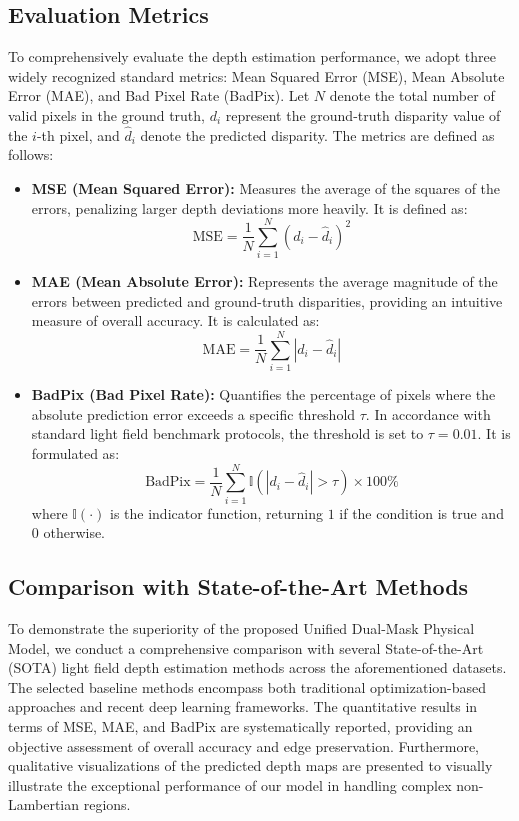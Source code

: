 \documentclass[lettersize,journal]{IEEEtran}
\begin{document}
\subsection{Evaluation Metrics}
To comprehensively evaluate the depth estimation performance, we adopt three widely recognized standard metrics: Mean Squared Error (MSE), Mean Absolute Error (MAE), and Bad Pixel Rate (BadPix). Let $N$ denote the total number of valid pixels in the ground truth, $d_i$ represent the ground-truth disparity value of the $i$-th pixel, and $\hat{d}_i$ denote the predicted disparity. The metrics are defined as follows:

\begin{itemize}
    \item \textbf{MSE (Mean Squared Error):} Measures the average of the squares of the errors, penalizing larger depth deviations more heavily. It is defined as:
    \begin{equation}
        \text{MSE} = \frac{1}{N} \sum_{i=1}^{N} (d_i - \hat{d}_i)^2
    \end{equation}
    
    \item \textbf{MAE (Mean Absolute Error):} Represents the average magnitude of the errors between predicted and ground-truth disparities, providing an intuitive measure of overall accuracy. It is calculated as:
    \begin{equation}
        \text{MAE} = \frac{1}{N} \sum_{i=1}^{N} |d_i - \hat{d}_i|
    \end{equation}
    
    \item \textbf{BadPix (Bad Pixel Rate):} Quantifies the percentage of pixels where the absolute prediction error exceeds a specific threshold $\tau$. In accordance with standard light field benchmark protocols, the threshold is set to $\tau = 0.01$. It is formulated as:
    \begin{equation}
        \text{BadPix} = \frac{1}{N} \sum_{i=1}^{N} \mathbb{I}(|d_i - \hat{d}_i| > \tau) \times 100\%
    \end{equation}
    where $\mathbb{I}(\cdot)$ is the indicator function, returning $1$ if the condition is true and $0$ otherwise.
\end{itemize}

\subsection{Comparison with State-of-the-Art Methods}
To demonstrate the superiority of the proposed Unified Dual-Mask Physical Model, we conduct a comprehensive comparison with several State-of-the-Art (SOTA) light field depth estimation methods across the aforementioned datasets. The selected baseline methods encompass both traditional optimization-based approaches and recent deep learning frameworks. The quantitative results in terms of MSE, MAE, and BadPix are systematically reported, providing an objective assessment of overall accuracy and edge preservation. Furthermore, qualitative visualizations of the predicted depth maps are presented to visually illustrate the exceptional performance of our model in handling complex non-Lambertian regions.
\end{document}
